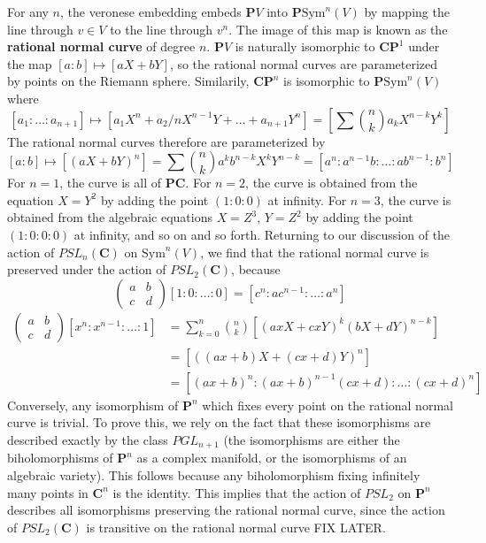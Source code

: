 \begin{example}
    For any $n$, the veronese embedding embeds $\mathbf{P}V$ into $\mathbf{P} \text{Sym}^n(V)$ by mapping the line through $v \in V$ to the line through $v^n$. The image of this map is known as the {\bf rational normal curve} of degree $n$. $\mathbf{P}V$ is naturally isomorphic to $\mathbf{C} \mathbf{P}^1$ under the map $[a:b] \mapsto [aX + bY]$, so the rational normal curves are parameterized by points on the Riemann sphere. Similarily, $\mathbf{CP}^n$ is isomorphic to $\mathbf{P}\text{Sym}^n(V)$ where
    \[ [a_1:\dots:a_{n+1}] \mapsto [a_1 X^n + a_2/n X^{n-1}Y + \dots + a_{n+1} Y^n] = \left[ \sum {n \choose k} a_k X^{n-k} Y^k \right] \]
    The rational normal curves therefore are parameterized by
    \[ [a:b] \mapsto [(aX + bY)^n] = \sum {n \choose k} a^k b^{n-k} X^k Y^{n-k} = [a^n:a^{n-1}b: \dots : ab^{n-1}: b^n] \]
    For $n = 1$, the curve is all of $\mathbf{PC}$. For $n = 2$, the curve is obtained from the equation $X = Y^2$ by adding the point $(1:0:0)$ at infinity. For $n = 3$, the curve is obtained from the algebraic equations $X = Z^3$, $Y = Z^2$ by adding the point $(1:0:0:0)$ at infinity, and so on and so forth. Returning to our discussion of the action of $PSL_n(\mathbf{C})$ on $\text{Sym}^n(V)$, we find that the rational normal curve is preserved under the action of $PSL_2(\mathbf{C})$, because
    \[ \begin{pmatrix} a & b \\ c & d \end{pmatrix} [1:0:\dots:0] = [c^n:ac^{n-1}: \dots : a^n] \]
    \begin{align*}
        \begin{pmatrix} a & b \\ c & d \end{pmatrix} [x^n:x^{n-1}: \dots:1] &= \sum_{k = 0}^n {n \choose k} [(axX + cxY)^k(bX + dY)^{n-k}]\\
        &= [((ax + b)X + (cx + d)Y)^n]\\
        &= [(ax + b)^n : (ax + b)^{n-1}(cx + d): \dots : (cx + d)^n]
    \end{align*}
    Conversely, any isomorphism of $\mathbf{P}^n$ which fixes every point on the rational normal curve is trivial. To prove this, we rely on the fact that these isomorphisms are described exactly by the class $PGL_{n+1}$ (the isomorphisms are either the biholomorphisms of $\mathbf{P}^n$ as a complex manifold, or the isomorphisms of an algebraic variety). This follows because any biholomorphism fixing infinitely many points in $\mathbf{C}^n$ is the identity. This implies that the action of $PSL_2$ on $\mathbf{P}^n$ describes all isomorphisms preserving the rational normal curve, since the action of $PSL_2(\mathbf{C})$ is transitive on the rational normal curve FIX LATER.
\end{example}

